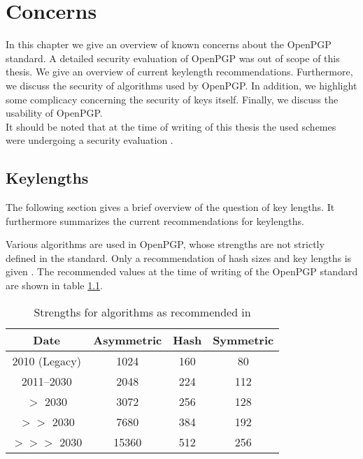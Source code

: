 \chapter{Concerns} \label{chapter:concerns}


In this chapter we give an overview of known concerns about the OpenPGP standard. A detailed security evaluation of OpenPGP was out of scope of this thesis. We give an overview of current keylength recommendations. Furthermore, we discuss the security of algorithms used by OpenPGP. In addition, we highlight some complicacy concerning the security of keys itself. Finally, we discuss the usability of OpenPGP. \\

It should be noted that at the time of writing of this thesis the used schemes were undergoing a security evaluation \citep{TUB2015}.



\section{Keylengths}

The following section gives a brief overview of the question of key lengths. It furthermore summarizes the current recommendations for keylengths. 

Various algorithms are used in OpenPGP, whose strengths are not strictly defined in the standard. 
Only a recommendation of hash sizes and key lengths is given \citep[section 14]{RFC4880}.
The recommended values at the time of writing of the OpenPGP standard are shown in table \ref{tab:keylengths}.

\begin{table}[h]
	\centering
	\begin{tabular}{|c|c|c|c|}
		\hline Date & 			Asymmetric & Hash & Symmetric \\ 
		\hline\hline 2010 (Legacy) & 1024 & 160 & 80 \\ 
		\hline 2011--2030 & 2048 & 224 & 112 \\ 
		\hline $>$ 2030 		   & 3072 & 256 & 128 \\ 
		\hline $>>$ 2030       & 7680 & 384 & 192 \\ 
		\hline $>>>$ 2030     & 15360 & 512 & 256 \\ 
		\hline 
	\end{tabular}
	\caption{Strengths for algorithms as recommended in \citep[section 14]{RFC4880}} 
		\label{tab:keylengths}
\end{table}

